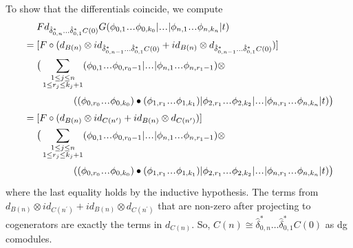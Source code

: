 \begin{eg}
To show that the differentials coincide, 
we compute 
\begin{align*}
& \phantom{{}={}}
Fd_{\hat{\delta}_{0,n}^*\dots\hat{\delta}_{0,1}^*C(0)}G
  (\phi_{0,1} \smdots \phi_{0,k_0} | \smdots |
  \phi_{n,1} \smdots \phi_{n,k_n} | t) \\
&=
[F \circ (d_{B(n)}\otimes 
  id_{\hat{\delta}_{0,n-1}^*\dots\hat{\delta}_{0,1}^*C(0)} + 
  id_{B(n)} \otimes 
  d_{\hat{\delta}_{0,n-1}^*\dots\hat{\delta}_{0,1}^*C(0)})] \\
& \phantom{{}=  {}}
\big( \sum \limits_{\substack{1 \leq j \leq n\\
  1 \leq r_j \leq k_j+1}}
  (\phi_{0,1} \smdots \phi_{0,r_0-1} | \smdots |
  \phi_{n,1} \smdots \phi_{n,r_1-1} ) \otimes \\
&\phantom{{}= \big( \sum \sum {}}
  ((\phi_{0,r_0}\smdots \phi_{0,k_0}) \bullet 
  (\phi_{1,r_1}\smdots \phi_{1,k_1}) |
  \phi_{2,r_1}\smdots \phi_{2,k_2} | \smdots |
  \phi_{n,r_1}\smdots \phi_{n,k_n} | t) \big) \\
&=
[F \circ (d_{B(n)}\otimes id_{C(n^\prime)} + 
  id_{B(n)} \otimes d_{C(n^\prime)})] \\
& \phantom{{}=  {}}
\big( \sum \limits_{\substack{1 \leq j \leq n\\
  1 \leq r_j \leq k_j+1}}
  (\phi_{0,1} \smdots \phi_{0,r_0-1} | \smdots |
  \phi_{n,1} \smdots \phi_{n,r_1-1}) \otimes \\
&\phantom{{}= \big( \sum \sum {}}
  ((\phi_{0,r_0}\smdots \phi_{0,k_0}) \bullet 
  (\phi_{1,r_1}\smdots \phi_{1,k_1}) |
  \phi_{2,r_1}\smdots \phi_{2,k_2} | \smdots |
  \phi_{n,r_1}\smdots \phi_{n,k_n} | t) \big)
\end{align*}
where the last equality holds by the 
inductive hypothesis. The terms from 
$d_{B(n)}\otimes id_{C(n^\prime)} + 
id_{B(n)} \otimes d_{C(n^\prime)}$ that
are non-zero after projecting to cogenerators 
are exactly the terms in $d_{C(n)}$. 
So, $C(n) \cong \hat{\delta}_{0,n}^*\dots
\hat{\delta}_{0,1}^*C(0)$ as dg comodules. 
\end{eg}
%
